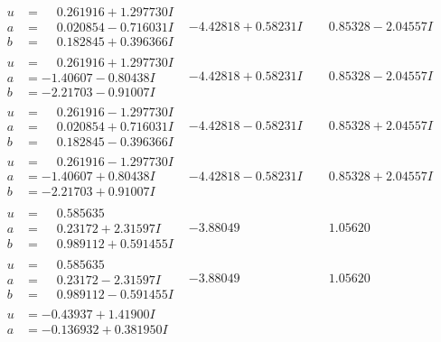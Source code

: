 \documentclass[1p]{elsarticle_modified}
\theoremstyle{definition}
\begin{document}
$$\begin{array}{c|c|c}
\begin{aligned}
u &= \phantom{-}0.261916 + 1.297730 I \\
a &= \phantom{-}0.020854 - 0.716031 I \\
b &= \phantom{-}0.182845 + 0.396366 I\end{aligned}
 & -4.42818 + 0.58231 I & \phantom{-}0.85328 - 2.04557 I \\ \hline\begin{aligned}
u &= \phantom{-}0.261916 + 1.297730 I \\
a &= -1.40607 - 0.80438 I \\
b &= -2.21703 - 0.91007 I\end{aligned}
 & -4.42818 + 0.58231 I & \phantom{-}0.85328 - 2.04557 I \\ \hline\begin{aligned}
u &= \phantom{-}0.261916 - 1.297730 I \\
a &= \phantom{-}0.020854 + 0.716031 I \\
b &= \phantom{-}0.182845 - 0.396366 I\end{aligned}
 & -4.42818 - 0.58231 I & \phantom{-}0.85328 + 2.04557 I \\ \hline\begin{aligned}
u &= \phantom{-}0.261916 - 1.297730 I \\
a &= -1.40607 + 0.80438 I \\
b &= -2.21703 + 0.91007 I\end{aligned}
 & -4.42818 - 0.58231 I & \phantom{-}0.85328 + 2.04557 I \\ \hline\begin{aligned}
u &= \phantom{-}0.585635\phantom{ +0.000000I} \\
a &= \phantom{-}0.23172 + 2.31597 I \\
b &= \phantom{-}0.989112 + 0.591455 I\end{aligned}
 & -3.88049\phantom{ +0.000000I} & \phantom{-}1.05620\phantom{ +0.000000I} \\ \hline\begin{aligned}
u &= \phantom{-}0.585635\phantom{ +0.000000I} \\
a &= \phantom{-}0.23172 - 2.31597 I \\
b &= \phantom{-}0.989112 - 0.591455 I\end{aligned}
 & -3.88049\phantom{ +0.000000I} & \phantom{-}1.05620\phantom{ +0.000000I} \\ \hline\begin{aligned}
u &= -0.43937 + 1.41900 I \\
a &= -0.136932 + 0.381950 I \\

\end{aligned}
\end{array}$$
\end{document}
